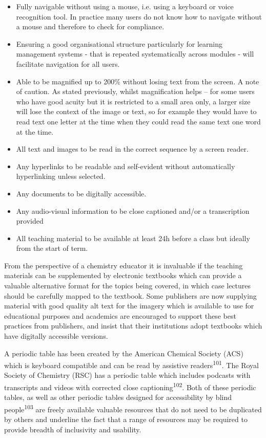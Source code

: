 \documentclass[11.5pt]{sig-alternate} %
\begin{document}
\begin{large}
\begin{itemize}
    \item Fully navigable without using a mouse, i.e. using a keyboard or voice recognition tool. In practice many users do not know how to navigate without a mouse and therefore to check for compliance. 
    \item Ensuring a good organisational structure particularly for learning management systems - that is repeated systematically across modules - will facilitate navigation for all users.
    \item Able to be magnified up to 200\% without losing text from the screen. A note of caution. As stated previously, whilst magnification helps – for some users who have good acuity but it is restricted to a small area only, a larger size will lose the context of the image or text, so for example they would have to read text one letter at the time when they could read the same text one word at the time. 
    \item All text and images to be read in the correct sequence by a screen reader.
    \item Any hyperlinks to be readable and self-evident without automatically hyperlinking unless selected.
    \item Any documents to be digitally accessible.
    \item Any audio-visual information to be close captioned and/or a transcription provided
    \item All teaching material to be available at least 24h before a class but ideally from the start of term.
\end{itemize}

From the perspective of a chemistry educator it is invaluable if the teaching materials can be supplemented by electronic textbooks which can provide a valuable alternative format for the topics being covered, in which case lectures should be carefully mapped to the textbook. Some publishers are now supplying material with good quality alt text for the imagery which is available to use for educational purposes and academics are encouraged to support these best practices from publishers, and insist that their institutions adopt textbooks which have digitally accessible versions.

A periodic table has been created by the American Chemical Society (ACS) which is keyboard compatible and can be read by assistive readers\textsuperscript{101}. The Royal Society of Chemistry (RSC) has a periodic table which includes podcasts with transcripts and videos with corrected close caption\-ing\textsuperscript{102}. Both of these periodic tables, as well as other periodic tables designed for accessibility by blind people\textsuperscript{103} are freely available valuable resources that do not need to be duplicated by others and underline the fact that a range of resources may be required to provide breadth of inclusivity and usability.


\end{large}
\end{document}
